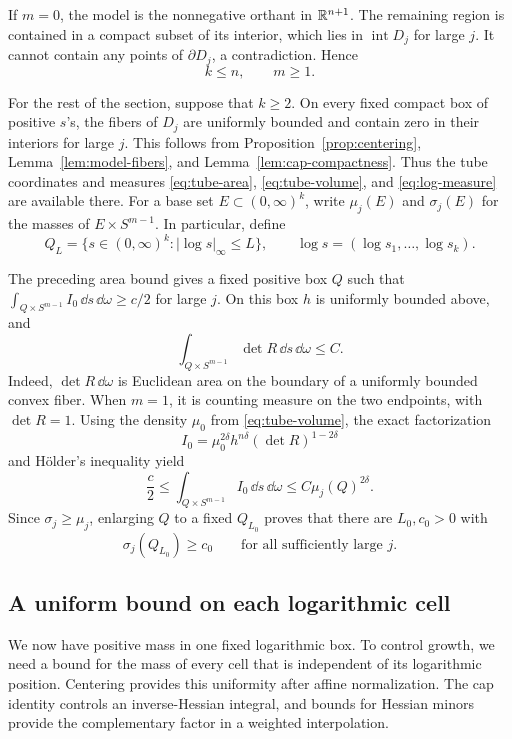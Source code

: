 If \(m=0\), the model is the nonnegative orthant in \(\mathbb R^{n+1}\).
The remaining region is contained in a compact subset of its interior,
which lies in \(\operatorname{int}D_j\) for large \(j\).
It cannot contain any points of \(\partial D_j\), a contradiction.
Hence
\begin{equation}\label{eq:transverse-dimension}
 k\le n,\qquad m\ge1.
\end{equation}

For the rest of the section, suppose that \(k\ge2\).
On every fixed compact box of positive \(s\)'s, the fibers of \(D_j\)
are uniformly bounded and contain zero in their interiors for large
\(j\).  This follows from Proposition~\ref{prop:centering},
Lemma~\ref{lem:model-fibers}, and Lemma~\ref{lem:cap-compactness}.
Thus the tube coordinates and measures
\eqref{eq:tube-area}, \eqref{eq:tube-volume}, and \eqref{eq:log-measure}
are available there.
For a base set \(E\subset(0,\infty)^k\), write \(\mu_j(E)\) and
\(\sigma_j(E)\) for the masses of \(E\times S^{m-1}\).
In particular, define
\[
 Q_L=\{s\in(0,\infty)^k:|\log s|_\infty\le L\},
 \qquad
 \log s=(\log s_1,\ldots,\log s_k).
\]

The preceding area bound gives a fixed positive box \(Q\) such that
\(\int_{Q\times S^{m-1}}I_0\,\dd s\,\dd\omega\ge c/2\) for large \(j\).
On this box \(h\) is uniformly bounded above, and
\[
 \int_{Q\times S^{m-1}}\det R\,\dd s\,\dd\omega\le C.
\]
Indeed, \(\det R\,\dd\omega\) is Euclidean area on the boundary of a
uniformly bounded convex fiber.  When \(m=1\), it is counting measure
on the two endpoints, with \(\det R=1\).
Using the density \(\mu_0\) from \eqref{eq:tube-volume}, the exact
factorization
\[
 I_0=\mu_0^{2\delta}h^{n\delta}(\det R)^{1-2\delta}
\]
and H\"older's inequality yield
\[
 \frac c2\le\int_{Q\times S^{m-1}} I_0\,\dd s\,\dd\omega
       \le C\mu_j(Q)^{2\delta}.
\]
Since \(\sigma_j\ge\mu_j\), enlarging \(Q\) to a fixed \(Q_{L_0}\)
proves that there are \(L_0,c_0>0\) with
\begin{equation}\label{eq:positive-log-mass}
 \sigma_j(Q_{L_0})\ge c_0
 \qquad\text{for all sufficiently large }j.
\end{equation}

\subsection{A uniform bound on each logarithmic cell}

We now have positive mass in one fixed logarithmic box. To control
growth, we need a bound for the mass of every cell that is independent
of its logarithmic position. Centering provides this uniformity after
affine normalization. The cap identity controls an inverse-Hessian
integral, and bounds for Hessian minors provide the complementary
factor in a weighted interpolation.

